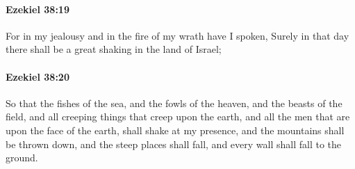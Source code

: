 		\paragraph{Ezekiel 38:19} %
			\label{EZEKIEL-38-19}

			For in my jealousy and in the fire of my wrath have I spoken, Surely in that day there shall be a great shaking in the land of Israel;


		\paragraph{Ezekiel 38:20} %
			\label{EZEKIEL-38-20}

			So that the fishes of the sea, and the fowls of the heaven, and the beasts of the field, and all creeping things that creep upon the earth, and all the men that are upon the face of the earth, shall shake at my presence, and the mountains shall be thrown down, and the steep places shall fall, and every wall shall fall to the ground.

